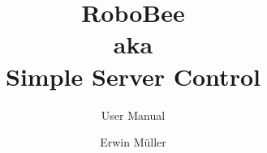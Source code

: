 \newcommand{\AppName}{RoboBee}
\newcommand{\TheEmail}{\url{erwin.mueller@deventm.org}}
\newcommand{\TheCurrentRevisionDate}{\TheRevisionOneDate}
\newcommand{\TheCurrentRevision}{\TheRevisionOne}
\newcommand{\TheCurrentDate}{\TheCurrentRevisionDate}
\newcommand{\TheAuthor}{Erwin Müller}
%
\title{RoboBee\\aka\\Simple Server Control}
\subtitle{User Manual}
\author{\TheAuthor}
\date{\TheCurrentRevision\\\TheCurrentDate}

\lowertitleback{%
\textcopyright{} 2016 \TheAuthor,\\\TheEmail{}\\All rights reserved\\
Logo Death Bee - Big by piewedge \textcopyright{} 2009-2016 piewedge,\\\url{http://piewedge.deviantart.com/art/Death-Bee-Big-129536022 }\\All rights reserved}

\newcommand{\TheRevisionOne}{Revision 1}
\newcommand{\TheRevisionOneDate}{}
%
\uppertitleback{
\TheRevisionOne{} \TheRevisionOneDate\\
}
